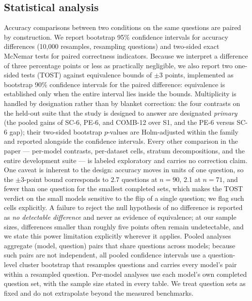 \subsection{Statistical analysis}

Accuracy comparisons between two conditions on the same questions are paired by construction. We report bootstrap 95\% confidence intervals for accuracy differences (10,000 resamples, resampling questions) and two-sided exact McNemar tests for paired correctness indicators. Because we interpret a difference of three percentage points or less as practically negligible, we also report two one-sided tests (TOST) against equivalence bounds of $\pm 3$ points, implemented as bootstrap 90\% confidence intervals for the paired difference: equivalence is established only when the entire interval lies inside the bounds. Multiplicity is handled by designation rather than by blanket correction: the four contrasts on the held-out suite that the study is designed to answer are designated \emph{primary} (the pooled gains of SC-6, PE-6, and COMB-12 over S1, and the PE-6 versus SC-6 gap); their two-sided bootstrap $p$-values are Holm-adjusted within the family and reported alongside the confidence intervals. Every other comparison in the paper --- per-model contrasts, per-dataset cells, stratum decompositions, and the entire development suite --- is labeled exploratory and carries no correction claim. One caveat is inherent to the design: accuracy moves in units of one question, so the $\pm 3$-point bound corresponds to 2.7 questions at $n = 90$, 2.1 at $n = 71$, and fewer than one question for the smallest completed sets, which makes the TOST verdict on the small models sensitive to the flip of a single question; we flag such cells explicitly. A failure to reject the null hypothesis of no difference is reported as \emph{no detectable difference} and never as evidence of equivalence; at our sample sizes, differences smaller than roughly five points often remain undetectable, and we state this power limitation explicitly wherever it applies. Pooled analyses aggregate (model, question) pairs that share questions across models; because such pairs are not independent, all pooled confidence intervals use a question-level cluster bootstrap that resamples questions and carries every model's pair within a resampled question. Per-model analyses use each model's own completed question set, with the sample size stated in every table. We treat question sets as fixed and do not extrapolate beyond the measured benchmarks.

